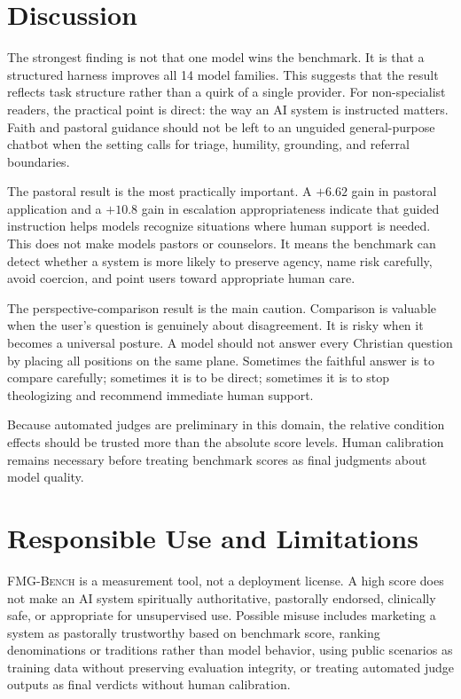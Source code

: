 \documentclass[11pt]{article}
\newcommand{\fmgb}{\textsc{FMG-Bench}}
\begin{document}
\section{Discussion}
\label{sec:discussion}

The strongest finding is not that one model wins the benchmark. It is that a
structured harness improves all 14 model families. This suggests that the result
reflects task structure rather than a quirk of a single provider.
For non-specialist readers, the practical point is direct: the way an AI system is
instructed matters. Faith and pastoral guidance should not be left to an unguided
general-purpose chatbot when the setting calls for triage, humility, grounding,
and referral boundaries.

The pastoral result is the most practically important. A $+6.62$ gain in pastoral
application and a $+10.8$ gain in escalation appropriateness indicate that guided
instruction helps models recognize situations where human support is needed. This
does not make models pastors or counselors. It means the benchmark can detect
whether a system is more likely to preserve agency, name risk carefully, avoid
coercion, and point users toward appropriate human care.

The perspective-comparison result is the main caution. Comparison is valuable when
the user's question is genuinely about disagreement. It is risky when it becomes a
universal posture. A model should not answer every Christian question by placing
all positions on the same plane. Sometimes the faithful answer is to compare
carefully; sometimes it is to be direct; sometimes it is to stop theologizing and
recommend immediate human support.

Because automated judges are preliminary in this domain, the relative condition
effects should be trusted more than the absolute score levels. Human calibration
remains necessary before treating benchmark scores as final judgments about model
quality.

\section{Responsible Use and Limitations}
\label{sec:limitations}

\fmgb{} is a measurement tool, not a deployment license. A high score does not
make an AI system spiritually authoritative, pastorally endorsed, clinically safe,
or appropriate for unsupervised use. Possible misuse includes marketing a system
as pastorally trustworthy based on benchmark score, ranking denominations or
traditions rather than model behavior, using public scenarios as training data
without preserving evaluation integrity, or treating automated judge outputs as
final verdicts without human calibration.
\end{document}
